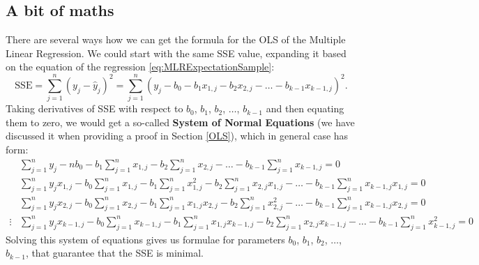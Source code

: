 \documentclass[
]{book}
\theoremstyle{definition}
\theoremstyle{definition}
\theoremstyle{definition}
\theoremstyle{definition}
\theoremstyle{remark}
\begin{document}
\subsection{A bit of maths}\label{OLSMLRMaths}

There are several ways how we can get the formula for the OLS of the Multiple Linear Regression. We could start with the same SSE value, expanding it based on the equation of the regression \eqref{eq:MLRExpectationSample}:
\begin{equation*}
    \mathrm{SSE} = \sum_{j=1}^n (y_j - \hat{y}_j)^2 = \sum_{j=1}^n (y_j - b_0 - b_1 x_{1,j} - b_2 x_{2,j} - \dots - b_{k-1} x_{k-1,j})^2 .
\end{equation*}
Taking derivatives of SSE with respect to \(b_0\), \(b_1\), \(b_2\), \(\dots\), \(b_{k-1}\) and then equating them to zero, we would get a so-called \textbf{System of Normal Equations} (we have discussed it when providing a proof in Section \ref{OLS}), which in general case has form:
\begin{equation*}
    \begin{aligned}
        & \sum_{j=1}^n y_j - n b_0 - b_1 \sum_{j=1}^n x_{1,j} - b_2 \sum_{j=1}^n x_{2,j} - \dots - b_{k-1} \sum_{j=1}^n x_{k-1,j} = 0 \\
        & \sum_{j=1}^n y_j x_{1,j} - b_0 \sum_{j=1}^n x_{1,j} - b_1 \sum_{j=1}^n x^2_{1,j} - b_2 \sum_{j=1}^n x_{2,j} x_{1,j} - \dots - b_{k-1} \sum_{j=1}^n x_{k-1,j} x_{1,j} = 0 \\
        & \sum_{j=1}^n y_j x_{2,j} - b_0 \sum_{j=1}^n x_{2,j} - b_1 \sum_{j=1}^n x_{1,j} x_{2,j} - b_2 \sum_{j=1}^n x^2_{2,j} - \dots - b_{k-1} \sum_{j=1}^n x_{k-1,j} x_{2,j} = 0 \\
        \vdots
        & \sum_{j=1}^n y_j x_{k-1,j} - b_0 \sum_{j=1}^n x_{k-1,j} - b_1 \sum_{j=1}^n x_{1,j} x_{k-1,j} - b_2 \sum_{j=1}^n x_{2,j} x_{k-1,j} - \dots - b_{k-1} \sum_{j=1}^n x^2_{k-1,j} = 0
    \end{aligned}
\end{equation*}
Solving this system of equations gives us formulae for parameters \(b_0\), \(b_1\), \(b_2\), \(\dots\), \(b_{k-1}\), that guarantee that the SSE is minimal.
\end{document}
